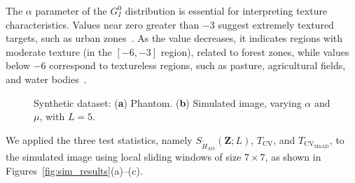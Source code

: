 \documentclass[remotesensing,article,submit,moreauthors,pdftex]{Definitions/mdpi}
\begin{document}
The \(\alpha\) parameter of the \(G_I^0\) distribution is essential for
interpreting texture characteristics. Values near zero greater than
\(-3\) suggest extremely textured targets, such as urban
zones~\cite{Frery2019a}. As the value decreases, it indicates regions
with moderate texture (in the \(\left[-6,-3\right]\) region), related to
forest zones, while values below \(-6\) correspond to textureless
regions, such as pasture, agricultural fields, and water
bodies~\cite{Neto2023}.

\begin{figure}[H]
\caption{Synthetic dataset: (\textbf{a}) Phantom. (\textbf{b}) Simulated image, varying $\alpha$ and $\mu$, with $L=5$. }\label{fig:sim_Phantom}
\end{figure}

We applied the three test statistics, namely
\(S_{\widetilde{H}_{\text{AO}}}(\bm{Z}; L)\), \(T_\text{CV}\), and
\(T_{\text{CV}_{\text{MnAD}}}\), to the simulated image using local
sliding windows of size \(7\times 7\), as shown in
Figures~\ref{fig:sim_results}(a)--(c).
\end{document}
